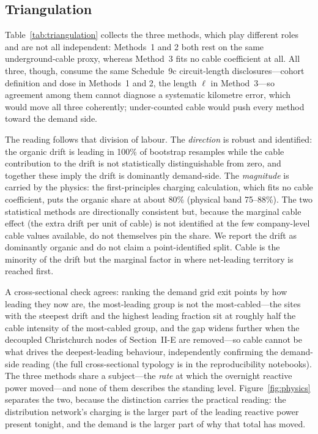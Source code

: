 \documentclass[journal]{IEEEtran}
\begin{document}
\subsection{Triangulation}
Table~\ref{tab:triangulation} collects the three methods, which play different roles
and are not all independent: Methods~1 and 2 both rest on the same underground-cable
proxy, whereas Method~3 fits no cable coefficient at
all. All three, though, consume the same Schedule~9c circuit-length
disclosures---cohort definition and dose in Methods~1 and 2, the length $\ell$
in Method~3---so agreement among them cannot diagnose a systematic kilometre
error, which would move all three coherently; under-counted cable would push
every method toward the demand side.

The reading follows that division of labour. The \emph{direction} is
robust and identified: the organic drift is leading in 100\% of bootstrap resamples
while the cable contribution to the drift is not statistically distinguishable from
zero, and together these imply the drift is dominantly demand-side. The
\emph{magnitude} is carried by the physics: the first-principles charging calculation,
which fits no cable coefficient, puts the organic share at about 80\% (physical band
75--88\%). The two statistical methods are directionally consistent but, because the
marginal cable effect (the extra drift per unit of cable) is not identified at
the few company-level cable values
available, do not themselves pin the share. We report the drift as dominantly organic
and do not claim a point-identified split. Cable is the minority of the drift but the
marginal factor in where net-leading territory is reached first.

A cross-sectional check agrees: ranking the demand grid exit points by how
leading they now are, the
most-leading group is not the most-cabled---the sites with the steepest drift and
the highest leading fraction sit at roughly half the cable intensity of the
most-cabled group, and the gap widens further when the decoupled Christchurch
nodes of Section~II-E are removed---so cable cannot be what drives the
deepest-leading behaviour, independently confirming the demand-side reading (the full cross-sectional
typology is in the reproducibility notebooks). The three methods share a subject---the \emph{rate} at which the
overnight reactive power moved---and none of them describes the standing level.
Figure~\ref{fig:physics} separates the two, because the distinction carries the
practical reading: the distribution network's charging is the larger part of the leading reactive power present tonight, and the demand is the larger part of why that total has moved.
\end{document}
